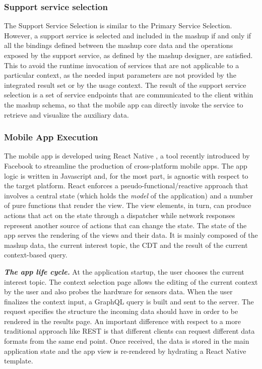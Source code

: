 \subsubsection{Support service selection}
The Support Service Selection is similar to the Primary Service
Selection. However, a support service is selected and included in the mashup if and only if all the bindings defined between the mashup core data and the operations exposed by the support service, as defined by the mashup designer, are satisfied. This to
avoid the runtime invocation of services that are not applicable to a
particular context, as the needed input parameters are not provided by the integrated result set or by the usage context. The result of the support service selection
is a set of service endpoints that are communicated to the client within the mashup schema, so that the mobile app can directly invoke the service to retrieve and visualize the auxiliary data.

\subsubsection{Mobile App Execution}

The mobile app is developed using {
React Native} \cite{docs:specs/facebook/react-native}, a tool recently
introduced by Facebook to streamline the production of cross-platform
mobile apps. The app logic is written in Javascript and, for the most
part, is agnostic with respect to the target platform.
React enforces a pseudo-functional/reactive approach that involves a
central state (which holds the \emph{model} of the application) and a
number of pure functions that render the view. The view elements, in
turn, can produce actions that act on the state through a dispatcher
while network responses represent another source of actions that can
change the state.
The state of the app serves the rendering of the views and their
data. It is mainly composed of the mashup data, the current interest
topic, the CDT and the result of the current context-based query.


\emph{\textbf{The app life cycle.}}
At the application startup, the user chooses the current interest
topic. The context selection page allows the editing of the current
context by the user and also probes the hardware for sensors data. When the
user finalizes the context input, a GraphQL query is built and sent to
the server. The request specifies the structure the incoming data
should have in order to be rendered in the results page. An important
difference with respect to a more traditional approach like REST is
that different clients can request different data formats from the same
end point. Once received, the data is stored in the main application
state and the app view is re-rendered by hydrating a React Native
template.

